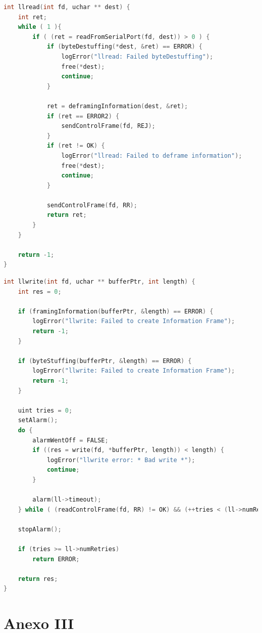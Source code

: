 \documentclass[a4paper, 11pt]{article}
\begin{document}
\begin{lstlisting}[caption = llread, language=C]
int llread(int fd, uchar ** dest) {
	int ret;
	while ( 1 ){
		if ( (ret = readFromSerialPort(fd, dest)) > 0 ) {
			if (byteDestuffing(*dest, &ret) == ERROR) {
				logError("llread: Failed byteDestuffing");
				free(*dest);
				continue;
			}

			ret = deframingInformation(dest, &ret);
			if (ret == ERROR2) {
				sendControlFrame(fd, REJ);
			}
			if (ret != OK) {
				logError("llread: Failed to deframe information");
				free(*dest);
				continue;
			}

			sendControlFrame(fd, RR);
			return ret;
		}
	}
	
	return -1;
}
\end{lstlisting}

\begin{lstlisting}[caption = llwrite, language=C]
int llwrite(int fd, uchar ** bufferPtr, int length) {
	int res = 0;

	if (framingInformation(bufferPtr, &length) == ERROR) {
		logError("llwrite: Failed to create Information Frame");
		return -1;
	}

	if (byteStuffing(bufferPtr, &length) == ERROR) {
		logError("llwrite: Failed to create Information Frame");
		return -1;
	}

	uint tries = 0;
	setAlarm();
	do {
		alarmWentOff = FALSE;
		if ((res = write(fd, *bufferPtr, length)) < length) {
			logError("llwrite error: * Bad write *");
			continue;
		}

		alarm(ll->timeout);
	} while ( (readControlFrame(fd, RR) != OK) && (++tries < (ll->numRetries)));

	stopAlarm();

	if (tries >= ll->numRetries)
		return ERROR;
		
	return res;
}
\end{lstlisting}

\newpage

\section{Anexo III}
\end{document}
